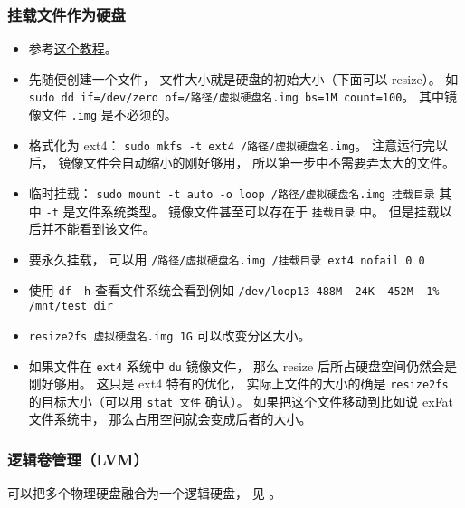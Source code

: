 \subsubsection{挂载文件作为硬盘}
\begin{itemize}
\item 参考\href{https://www.tecmint.com/create-virtual-harddisk-volume-in-linux/}{这个教程}。
\item 先随便创建一个文件， 文件大小就是硬盘的初始大小（下面可以 resize）。 如 \verb|sudo dd if=/dev/zero of=/路径/虚拟硬盘名.img bs=1M count=100|。 其中镜像文件 \verb|.img| 是不必须的。
\item 格式化为 ext4： \verb|sudo mkfs -t ext4 /路径/虚拟硬盘名.img|。 注意运行完以后， 镜像文件会自动缩小的刚好够用， 所以第一步中不需要弄太大的文件。
\item 临时挂载： \verb|sudo mount -t auto -o loop /路径/虚拟硬盘名.img 挂载目录| 其中 \verb|-t| 是文件系统类型。 镜像文件甚至可以存在于 \verb|挂载目录| 中。 但是挂载以后并不能看到该文件。
\item 要永久挂载， 可以用 \verb|/路径/虚拟硬盘名.img /挂载目录 ext4 nofail 0 0|
\item 使用 \verb|df -h| 查看文件系统会看到例如 \verb|/dev/loop13 488M  24K  452M  1% /mnt/test_dir|
\item \verb|resize2fs 虚拟硬盘名.img 1G| 可以改变分区大小。
\item 如果文件在 \verb|ext4| 系统中 \verb|du| 镜像文件， 那么 resize 后所占硬盘空间仍然会是刚好够用。 这只是 ext4 特有的优化， 实际上文件的大小的确是 \verb|resize2fs| 的目标大小（可以用 \verb|stat 文件| 确认）。 如果把这个文件移动到比如说 exFat 文件系统中， 那么占用空间就会变成后者的大小。
\end{itemize}

\subsubsection{逻辑卷管理（LVM）}
可以把多个物理硬盘融合为一个逻辑硬盘， 见 。

